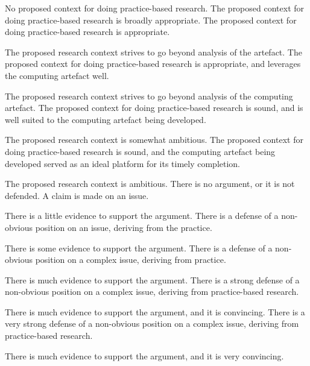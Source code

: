 \documentclass{../../fal_assignment}
\begin{document}
\begin{markingrubric}
%
        \grade\fail No proposed context for doing practice-based research.
        \grade The proposed context for doing practice-based research is broadly appropriate.
        \grade The proposed context for doing practice-based research is appropriate.
        \par The proposed research context strives to go beyond analysis of the artefact.
        \grade The proposed context for doing practice-based research is appropriate, and leverages the computing artefact well.
        \par The proposed research context strives to go beyond analysis of the computing artefact.
        \grade The proposed context for doing practice-based research is sound, and is well suited to the computing artefact being developed.
        \par The proposed research context is somewhat ambitious.
        \grade The proposed context for doing practice-based research is sound, and the computing artefact being developed served as an ideal platform for its timely completion. 
        \par The proposed research context is ambitious.
%
        \grade\fail There is no argument, or it is not defended.
        \grade A claim is made on an issue.
            \par There is a little evidence to support the argument.
        \grade There is a defense of a non-obvious position on an issue, deriving from the practice.
            \par There is some evidence to support the argument.
        \grade There is a defense of a non-obvious position on a complex issue, deriving from practice.
            \par There is much evidence to support the argument.
        \grade There is a strong defense of a non-obvious position on a complex issue, deriving from practice-based research.
            \par There is much evidence to support the argument, and it is convincing.
        \grade There is a very strong defense of a non-obvious position on a complex issue, deriving from practice-based research.
            \par There is much evidence to support the argument, and it is very convincing.
%

\end{markingrubric}
\end{document}
